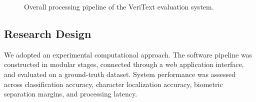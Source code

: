 \documentclass[conference]{IEEEtran}
\begin{document}
\begin{figure}[htbp]
\centering
{}
\caption{Overall processing pipeline of the VeriText evaluation system.}
\label{fig:architecture}
\end{figure}

\subsection{Research Design}
We adopted an experimental computational approach. The software pipeline was constructed in modular stages, connected through a web application interface, and evaluated on a ground-truth dataset. System performance was assessed across classification accuracy, character localization accuracy, biometric separation margins, and processing latency.
\end{document}
